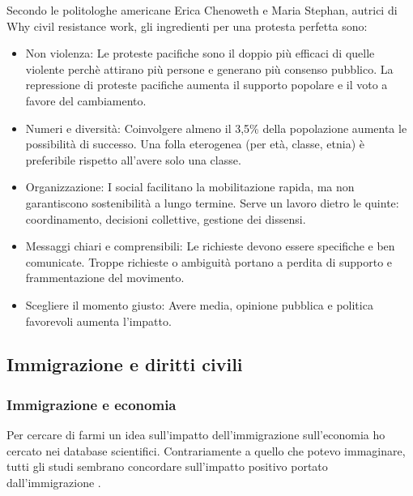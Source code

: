 \documentclass[12pt]{book} %
\begin{document}
\begin{mdframed}[linewidth=1pt]
Secondo le politologhe americane Erica Chenoweth e Maria Stephan, autrici di Why civil resistance work, gli ingredienti per una protesta perfetta sono:
\begin{itemize}
\item Non violenza: Le proteste pacifiche sono il doppio più efficaci di quelle violente perchè attirano più persone e generano più consenso pubblico. La repressione di proteste pacifiche aumenta il supporto popolare e il voto a favore del cambiamento.
\item Numeri e diversità: Coinvolgere almeno il 3,5\% della popolazione aumenta le possibilità di successo. Una folla eterogenea (per età, classe, etnia) è preferibile rispetto all'avere solo una classe.
\item Organizzazione: I social facilitano la mobilitazione rapida, ma non garantiscono sostenibilità a lungo termine. Serve un lavoro dietro le quinte: coordinamento, decisioni collettive, gestione dei dissensi.
\item Messaggi chiari e comprensibili: Le richieste devono essere specifiche e ben comunicate. Troppe richieste o ambiguità portano a perdita di supporto e frammentazione del movimento.
\item Scegliere il momento giusto: Avere media, opinione pubblica e politica favorevoli aumenta l’impatto.
\end{itemize}
\end{mdframed}

\subsection{Immigrazione e diritti civili}

\subsubsection{Immigrazione e economia}
Per cercare di farmi un idea sull'impatto dell'immigrazione sull'economia ho cercato nei database scientifici. Contrariamente a quello che potevo immaginare, tutti gli studi sembrano concordare sull'impatto positivo portato dall'immigrazione   .
\end{document}
